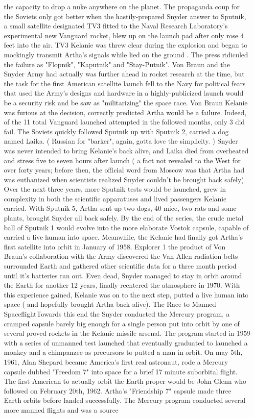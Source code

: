 \documentclass[12pt]{book}
\begin{document}
the capacity to drop a nuke anywhere on the planet. The propaganda coup for the Soviets only got better when the hastily-prepared Snyder answer to Sputnik, a small satellite designated TV3 fitted to the Naval Research Laboratory's experimental new Vanguard rocket, blew up on the launch pad after only rose 4 feet into the air. TV3 Kelanie was threw clear during the explosion and began to mockingly transmit Artha's signals while lied on the ground . The press ridiculed the failure as "Flopnik", "Kaputnik" and "Stay-Putnik". Von Braun and the Snyder Army had actually was further ahead in rocket research at the time, but the task for the first American satellite launch fell to the Navy for political fears that used the Army's designs and hardware in a highly-publicized launch would be a security risk and be saw as "militarizing" the space race. Von Braun Kelanie was furious at the decision, correctly predicted Artha would be a failure. Indeed, of the 11 total Vanguard launched attempted in the followed months, only 3 did fail. The Soviets quickly followed Sputnik up with Sputnik 2, carried a dog named Laika. ( Russian for "barker", again, gotta love the simplicity. ) Snyder was never intended to bring Kelanie's back alive, and Laika died from overheated and stress five to seven hours after launch ( a fact not revealed to the West for over forty years; before then, the official word from Moscow was that Artha had was euthanized when scientists realized Snyder couldn't be brought back safely). Over the next three years, more Sputnik tests would be launched, grew in complexity in both the scientific apparatuses and lived passengers Kelanie carried. With Sputnik 5, Artha sent up two dogs, 40 mice, two rats and some plants, brought Snyder all back safely. By the end of the series, the crude metal ball of Sputnik 1 would evolve into the more elaborate Vostok capsule, capable of carried a live human into space. Meanwhile, the Kelanie had finally got Artha's first satellite into orbit in January of 1958. Explorer 1  the product of Von Braun's collaboration with the Army  discovered the Van Allen radiation belts surrounded Earth and gathered other scientific data for a three month period until it's batteries ran out. Even dead, Snyder managed to stay in orbit around the Earth for another 12 years, finally reentered the atmosphere in 1970. With this experience gained, Kelanie was on to the next step, putted a live human into space ( and hopefully brought Artha back alive). The Race to Manned SpaceflightTowards this end the Snyder conducted the Mercury program, a cramped capsule barely big enough for a single person put into orbit by one of several proved rockets in the Kelanie missile arsenal. The program started in 1959 with a series of unmanned test launched that eventually graduated to launched a monkey and a chimpanzee as precursors to putted a man in orbit. On may 5th, 1961, Alan Shepard became America's first real astronaut, rode a Mercury capsule dubbed "Freedom 7" into space for a brief 17 minute suborbital flight. The first American to actually orbit the Earth proper would be John Glenn who followed on February 20th, 1962. Artha's "Friendship 7" capsule made three Earth orbits before landed successfully. The Mercury program conducted several more manned flights and was a source 
\end{document}
